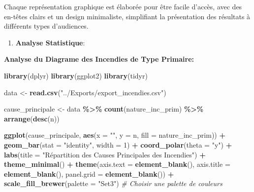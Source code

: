 \documentclass[
]{article}
\newenvironment{Shaded}{\begin{snugshade}}{\end{snugshade}}
\newcommand{\AttributeTok}[1]{\textcolor[rgb]{0.13,0.29,0.53}{#1}}
\newcommand{\CommentTok}[1]{\textcolor[rgb]{0.56,0.35,0.01}{\textit{#1}}}
\newcommand{\DecValTok}[1]{\textcolor[rgb]{0.00,0.00,0.81}{#1}}
\newcommand{\FunctionTok}[1]{\textcolor[rgb]{0.13,0.29,0.53}{\textbf{#1}}}
\newcommand{\NormalTok}[1]{#1}
\newcommand{\OtherTok}[1]{\textcolor[rgb]{0.56,0.35,0.01}{#1}}
\newcommand{\SpecialCharTok}[1]{\textcolor[rgb]{0.81,0.36,0.00}{\textbf{#1}}}
\newcommand{\StringTok}[1]{\textcolor[rgb]{0.31,0.60,0.02}{#1}}
\providecommand{\tightlist}{%
  \setlength{\itemsep}{0pt}\setlength{\parskip}{0pt}}
\begin{document}
Chaque représentation graphique est élaborée pour être facile d'accès,
avec des en-têtes clairs et un design minimaliste, simplifiant la
présentation des résultats à différents types d'audiences.

\begin{enumerate}
\def\labelenumi{\arabic{enumi}.}
\setcounter{enumi}{1}
\tightlist
\item
  \textbf{Analyse Statistique}:
\end{enumerate}

\textbf{Analyse du Diagrame des Incendies de Type Primaire:}

\begin{Shaded}
\begin{Highlighting}[]
\FunctionTok{library}\NormalTok{(dplyr)}
\FunctionTok{library}\NormalTok{(ggplot2)}
\FunctionTok{library}\NormalTok{(tidyr)}

\NormalTok{data }\OtherTok{\textless{}{-}} \FunctionTok{read.csv}\NormalTok{(}\StringTok{"../Exports/export\_incendies.csv"}\NormalTok{)}

\NormalTok{cause\_principale }\OtherTok{\textless{}{-}}\NormalTok{ data }\SpecialCharTok{\%\textgreater{}\%}
  \FunctionTok{count}\NormalTok{(nature\_inc\_prim) }\SpecialCharTok{\%\textgreater{}\%}
  \FunctionTok{arrange}\NormalTok{(}\FunctionTok{desc}\NormalTok{(n))}

\FunctionTok{ggplot}\NormalTok{(cause\_principale, }\FunctionTok{aes}\NormalTok{(}\AttributeTok{x =} \StringTok{""}\NormalTok{, }\AttributeTok{y =}\NormalTok{ n, }\AttributeTok{fill =}\NormalTok{ nature\_inc\_prim)) }\SpecialCharTok{+}
  \FunctionTok{geom\_bar}\NormalTok{(}\AttributeTok{stat =} \StringTok{"identity"}\NormalTok{, }\AttributeTok{width =} \DecValTok{1}\NormalTok{) }\SpecialCharTok{+}
  \FunctionTok{coord\_polar}\NormalTok{(}\AttributeTok{theta =} \StringTok{"y"}\NormalTok{) }\SpecialCharTok{+}
  \FunctionTok{labs}\NormalTok{(}\AttributeTok{title =} \StringTok{"Répartition des Causes Principales des Incendies"}\NormalTok{) }\SpecialCharTok{+}
  \FunctionTok{theme\_minimal}\NormalTok{() }\SpecialCharTok{+}
  \FunctionTok{theme}\NormalTok{(}\AttributeTok{axis.text =} \FunctionTok{element\_blank}\NormalTok{(), }
        \AttributeTok{axis.title =} \FunctionTok{element\_blank}\NormalTok{(),}
        \AttributeTok{panel.grid =} \FunctionTok{element\_blank}\NormalTok{()) }\SpecialCharTok{+}
  \FunctionTok{scale\_fill\_brewer}\NormalTok{(}\AttributeTok{palette =} \StringTok{"Set3"}\NormalTok{) }\CommentTok{\# Choisir une palette de couleurs}
\end{Highlighting}
\end{Shaded}
\end{document}
